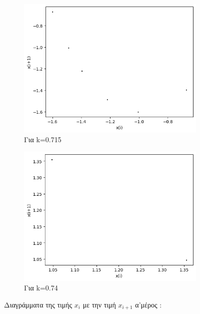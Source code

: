 \begin{figure}[h!]
\begin{subfigure}[b]{0.4\textwidth}
		\includegraphics[width=\textwidth]{LateX images/graphs q16/g15}
		\caption{Για k=0.715}
		\label{f:k86}
	\end{subfigure}
	\hfill
	\begin{subfigure}[b]{0.4\textwidth}
		\centering
		\includegraphics[width=\textwidth]{LateX images/graphs q16/g16}
		\caption{Για k=0.74}
		\label{f:k87}
	\end{subfigure}
	\hfill
	
	\caption{Διαγράμματα της τιμής \(x_i\) με την τιμή \(x_{i+1}\) α'μέρος :}
	\label{f:k240}
\end{figure}
